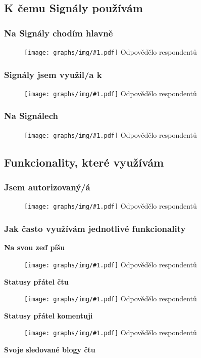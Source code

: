 \documentclass[12pt, a4paper, twoside]{article}
\newcommand{\answercount}[1]{Odpovědělo  respondentů}
\newcommand{\includegraph}[2]{
  \begin{figure}[H]
    \centering
    \textbf{#2}
    \texttt{[image: graphs/img/\#1.pdf]}
    \answercount{#1}
  \end{figure}
}
\begin{document}
\subsection{K čemu Signály používám}\label{sec:kcemu}

\subsubsection{Na Signály chodím hlavně}

\includegraph{na_signaly_chodim_hlavne}{}

\subsubsection{Signály jsem využil/a k}

\includegraph{signaly_jsem_vyuzil_k}{}

\subsubsection{Na Signálech }

\includegraph{na_signalech_se_mi_povedlo}{}

\subsection{Funkcionality, které využívám}\label{sec:funkcionality}

\subsubsection{Jsem autorizovaný/á}

\includegraph{jsem_autorizovany}{}

\subsubsection{Jak často využívám jednotlivé funkcionality}

\textbf{Na svou zeď píšu}

\includegraph{funkcionality_status_pisu}{}

\textbf{Statusy přátel čtu}

\includegraph{funkcionality_status_ctu}{}

\textbf{Statusy přátel komentuji}

\includegraph{funkcionality_status_komentuji}{}

\textbf{Svoje sledované blogy čtu}
\end{document}
